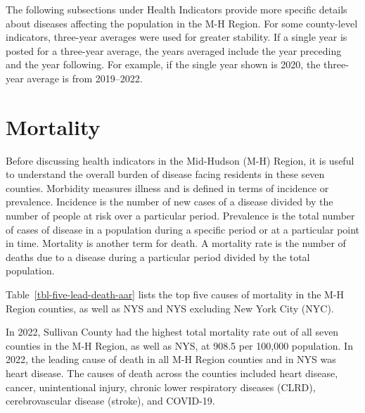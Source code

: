 \documentclass[
  english,
  letterpaper,
]{report}
\begin{document}
The following subsections under Health Indicators provide more specific
details about diseases affecting the population in the M-H Region. For
some county-level indicators, three-year averages were used for greater
stability. If a single year is posted for a three-year average, the
years averaged include the year preceding and the year following. For
example, if the single year shown is 2020, the three-year average is
from 2019--2022.

\section{Mortality}\label{mortality}

Before discussing health indicators in the Mid-Hudson (M-H) Region, it
is useful to understand the overall burden of disease facing residents
in these seven counties. Morbidity measures illness and is defined in
terms of incidence or prevalence. Incidence is the number of new cases
of a disease divided by the number of people at risk over a particular
period. Prevalence is the total number of cases of disease in a
population during a specific period or at a particular point in time.
Mortality is another term for death. A mortality rate is the number of
deaths due to a disease during a particular period divided by the total
population.

Table~\ref{tbl-five-lead-death-aar} lists the top five causes of
mortality in the M-H Region counties, as well as NYS and NYS excluding
New York City (NYC).

In 2022, Sullivan County had the highest total mortality rate out of all
seven counties in the M-H Region, as well as NYS, at 908.5 per 100,000
population. In 2022, the leading cause of death in all M-H Region
counties and in NYS was heart disease. The causes of death across the
counties included heart disease, cancer, unintentional injury, chronic
lower respiratory diseases (CLRD), cerebrovascular disease (stroke), and
COVID-19.
\end{document}
